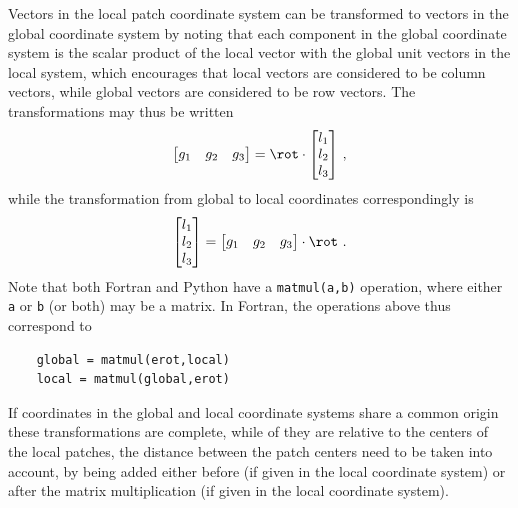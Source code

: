 \documentclass[paper=a4,fontsize=11pt]{scrartcl}
\numberwithin{equation}{section}		%
\numberwithin{figure}{section}			%
\numberwithin{table}{section}				%
\newcommand{\codecolor}{\color{Blue}}
\newcommand{\Code}[1]{{\codecolor\texttt{#1}}}
\begin{document}
Vectors in the local patch coordinate system can be transformed to vectors in the global coordinate system by noting that each component in the global coordinate system is the scalar product of the local vector with the global unit vectors in the local system, which encourages that local vectors are considered to be column vectors, while global vectors are considered to be row vectors.  The transformations may thus be written
\begin{equation}
    \begin{bmatrix}
    g_1 & g_2 & g_3 
    \end{bmatrix}
    = \rot \cdot
    \begin{bmatrix}
    l_1 \\
    l_2 \\
    l_3
    \end{bmatrix} \,,
\end{equation}
while the transformation from global to local coordinates correspondingly is
\begin{equation}
    \begin{bmatrix}
    l_1 \\
    l_2 \\
    l_3
    \end{bmatrix}
    = 
    \begin{bmatrix}
    g_1 & g_2 & g_3 
    \end{bmatrix} 
    \cdot \rot \ .
\end{equation}
Note that both Fortran and Python have a \Code{matmul(a,b)} operation, where either \Code{a} or \Code{b} (or both) may be a matrix.  In Fortran, the operations above thus correspond to 
{\codecolor\small\begin{verbatim}
    global = matmul(erot,local)
    local = matmul(global,erot)
\end{verbatim}}

If coordinates in the global and local coordinate systems share a common origin these transformations are complete, while of they are relative to the centers of the local patches, the distance between the patch centers need to be taken into account, by being added either before (if given in the local coordinate system) or after the matrix multiplication (if given in the local coordinate system).

\end{document}
